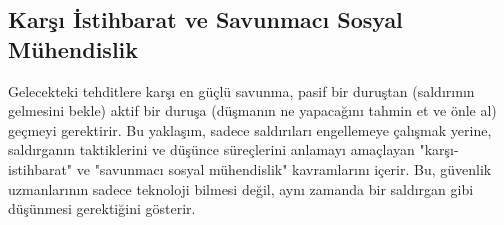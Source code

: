 \subsection{Karşı İstihbarat ve Savunmacı Sosyal Mühendislik}

Gelecekteki tehditlere karşı en güçlü savunma, pasif bir duruştan (saldırının gelmesini bekle) aktif bir duruşa (düşmanın ne yapacağını tahmin et ve önle al) geçmeyi gerektirir. Bu yaklaşım, sadece saldırıları engellemeye çalışmak yerine, saldırganın taktiklerini ve düşünce süreçlerini anlamayı amaçlayan "karşı-istihbarat" ve "savunmacı sosyal mühendislik" kavramlarını içerir. Bu, güvenlik uzmanlarının sadece teknoloji bilmesi değil, aynı zamanda bir saldırgan gibi düşünmesi gerektiğini gösterir.